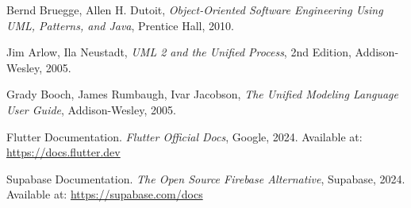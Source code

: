 \documentclass[12pt,a4paper]{report}
\begin{document}
\begin{thebibliography}{9}
Bernd Bruegge, Allen H. Dutoit, \textit{Object-Oriented Software Engineering Using UML, Patterns, and Java}, Prentice Hall, 2010.

Jim Arlow, Ila Neustadt, \textit{UML 2 and the Unified Process}, 2nd Edition, Addison-Wesley, 2005.

Grady Booch, James Rumbaugh, Ivar Jacobson, \textit{The Unified Modeling Language User Guide}, Addison-Wesley, 2005.

Flutter Documentation. \textit{Flutter Official Docs}, Google, 2024. Available at: \url{https://docs.flutter.dev}

Supabase Documentation. \textit{The Open Source Firebase Alternative}, Supabase, 2024. Available at: \url{https://supabase.com/docs}

\end{thebibliography}
\end{document}
